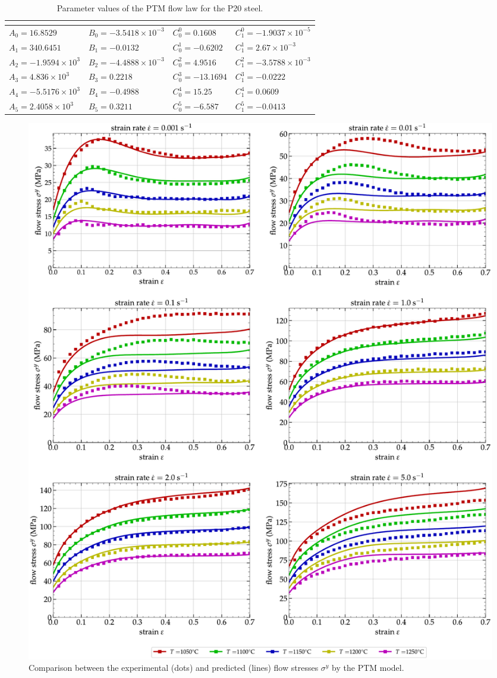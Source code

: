 \documentclass[metals,article,accept,pdftex,moreauthors]{Definitions/mdpi}
\begin{document}
\begin{table}[H]
\centering
\caption{Parameter values of the PTM flow law for the P20 steel.}
\begin{tabularx}{\textwidth}{LLLL}
\toprule
{} &  &  &  \\
\midrule
$A_0=16.8529$ & $B_0=-3.5418\times 10^{-3}$ & $C_0^0=0.1608$ & $C_1^0=-1.9037\times 10^{-5}$ \\
$A_1=340.6451$ & $B_1=-0.0132$ & $C_0^1=-0.6202$ & $C_1^1=2.67\times 10^{-3}$ \\
$A_2=-1.9594\times 10^{3}$ & $B_2=-4.4888\times 10^{-3}$ & $C_0^2=4.9516$ & $C_1^2=-3.5788\times 10^{-3}$ \\
$A_3=4.836\times 10^{3}$ & $B_3=0.2218$ & $C_0^3=-13.1694$ & $C_1^3=-0.0222$ \\
$A_4=-5.5176\times 10^{3}$ & $B_4=-0.4988$ & $C_0^4=15.25$ & $C_1^4=0.0609$ \\
$A_5=2.4058\times 10^{3}$ & $B_5=0.3211$ & $C_0^5=-6.587$ & $C_1^5=-0.0413$ \\
\bottomrule
\end{tabularx}
\label{tab:PTM}
\end{table}

\begin{figure}[H]

\includegraphics[width=0.98\columnwidth]
{Figures/CompExp-PTM-6}
\caption{Comparison between the experimental (dots) and predicted (lines) flow stresses $\sigma^y$ by the PTM model.}
\label{fig:CompExp-PTM-6}
\end{figure}
\end{document}
